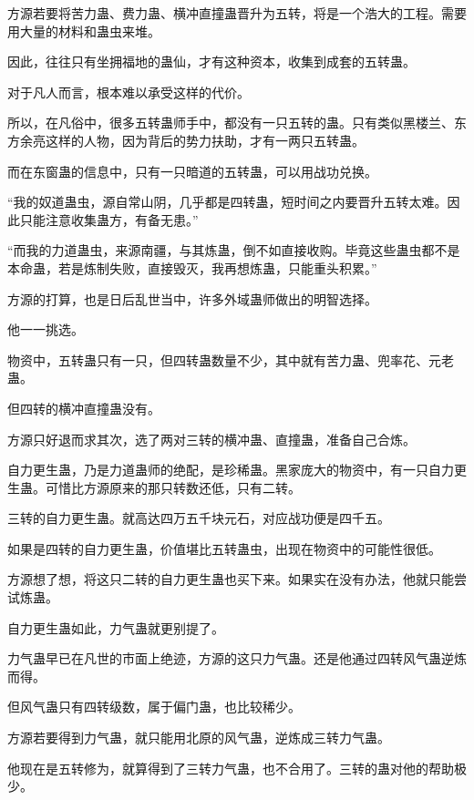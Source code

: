 
\begin{this_body}



方源若要将苦力蛊、费力蛊、横冲直撞蛊晋升为五转，将是一个浩大的工程。需要用大量的材料和蛊虫来堆。

因此，往往只有坐拥福地的蛊仙，才有这种资本，收集到成套的五转蛊。

对于凡人而言，根本难以承受这样的代价。

所以，在凡俗中，很多五转蛊师手中，都没有一只五转的蛊。只有类似黑楼兰、东方余亮这样的人物，因为背后的势力扶助，才有一两只五转蛊。

而在东窗蛊的信息中，只有一只暗道的五转蛊，可以用战功兑换。

“我的奴道蛊虫，源自常山阴，几乎都是四转蛊，短时间之内要晋升五转太难。因此只能注意收集蛊方，有备无患。”

“而我的力道蛊虫，来源南疆，与其炼蛊，倒不如直接收购。毕竟这些蛊虫都不是本命蛊，若是炼制失败，直接毁灭，我再想炼蛊，只能重头积累。”

方源的打算，也是日后乱世当中，许多外域蛊师做出的明智选择。

他一一挑选。

物资中，五转蛊只有一只，但四转蛊数量不少，其中就有苦力蛊、兜率花、元老蛊。

但四转的横冲直撞蛊没有。

方源只好退而求其次，选了两对三转的横冲蛊、直撞蛊，准备自己合炼。

自力更生蛊，乃是力道蛊师的绝配，是珍稀蛊。黑家庞大的物资中，有一只自力更生蛊。可惜比方源原来的那只转数还低，只有二转。

三转的自力更生蛊。就高达四万五千块元石，对应战功便是四千五。

如果是四转的自力更生蛊，价值堪比五转蛊虫，出现在物资中的可能性很低。

方源想了想，将这只二转的自力更生蛊也买下来。如果实在没有办法，他就只能尝试炼蛊。

自力更生蛊如此，力气蛊就更别提了。

力气蛊早已在凡世的市面上绝迹，方源的这只力气蛊。还是他通过四转风气蛊逆炼而得。

但风气蛊只有四转级数，属于偏门蛊，也比较稀少。

方源若要得到力气蛊，就只能用北原的风气蛊，逆炼成三转力气蛊。

他现在是五转修为，就算得到了三转力气蛊，也不合用了。三转的蛊对他的帮助极少。


\end{this_body}
